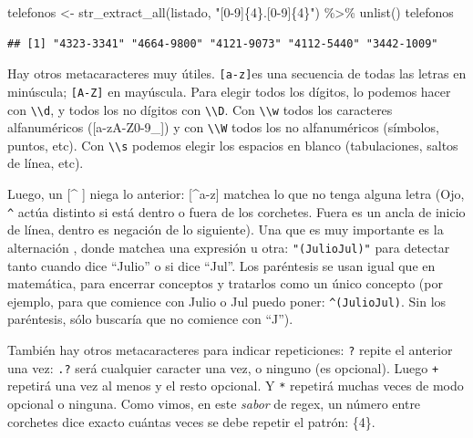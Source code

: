 \documentclass[
]{book}
\newenvironment{Shaded}{\begin{snugshade}}{\end{snugshade}}
\newcommand{\FunctionTok}[1]{\textcolor[rgb]{0.00,0.00,0.00}{#1}}
\newcommand{\NormalTok}[1]{#1}
\newcommand{\OtherTok}[1]{\textcolor[rgb]{0.56,0.35,0.01}{#1}}
\newcommand{\SpecialCharTok}[1]{\textcolor[rgb]{0.00,0.00,0.00}{#1}}
\newcommand{\StringTok}[1]{\textcolor[rgb]{0.31,0.60,0.02}{#1}}
\begin{document}
\begin{Shaded}
\begin{Highlighting}[]
\NormalTok{telefonos }\OtherTok{\textless{}{-}} \FunctionTok{str\_extract\_all}\NormalTok{(listado, }\StringTok{"[0{-}9]\{4\}.[0{-}9]\{4\}"}\NormalTok{) }\SpecialCharTok{\%\textgreater{}\%} 
  \FunctionTok{unlist}\NormalTok{()}
\NormalTok{telefonos}
\end{Highlighting}
\end{Shaded}

\begin{verbatim}
## [1] "4323-3341" "4664-9800" "4121-9073" "4112-5440" "3442-1009"
\end{verbatim}

Hay otros metacaracteres muy útiles. \texttt{{[}a-z{]}}es una secuencia de todas las letras en minúscula; \texttt{{[}A-Z{]}} en mayúscula. Para elegir todos los dígitos, lo podemos hacer con \texttt{\textbackslash{}\textbackslash{}d}, y todos los no dígitos con \texttt{\textbackslash{}\textbackslash{}D}. Con \texttt{\textbackslash{}\textbackslash{}w} todos los caracteres alfanuméricos ({[}a-zA-Z0-9\_{]}) y con \texttt{\textbackslash{}\textbackslash{}W} todos los no alfanuméricos (símbolos, puntos, etc). Con \texttt{\textbackslash{}\textbackslash{}s} podemos elegir los espacios en blanco (tabulaciones, saltos de línea, etc).

Luego, un {[}\^{} {]} niega lo anterior: {[}\^{}a-z{]} matchea lo que no tenga alguna letra (Ojo, \texttt{\^{}} actúa distinto si está dentro o fuera de los corchetes. Fuera es un ancla de inicio de línea, dentro es negación de lo siguiente). Una que es muy importante es la alternación \texttt{\textbar{}}, donde matchea una expresión u otra: \texttt{"(Julio\textbar{}Jul)"} para detectar tanto cuando dice ``Julio'' o si dice ``Jul''. Los paréntesis se usan igual que en matemática, para encerrar conceptos y tratarlos como un único concepto (por ejemplo, para que comience con Julio o Jul puedo poner: \texttt{\^{}(Julio\textbar{}Jul)}. Sin los paréntesis, sólo buscaría que no comience con ``J'').

También hay otros metacaracteres para indicar repeticiones: \texttt{?} repite el anterior una vez: \texttt{.?} será cualquier caracter una vez, o ninguno (es opcional). Luego \texttt{+} repetirá una vez al menos y el resto opcional. Y \texttt{*} repetirá muchas veces de modo opcional o ninguna. Como vimos, en este \emph{sabor} de regex, un número entre corchetes dice exacto cuántas veces se debe repetir el patrón: \{4\}.
\end{document}
